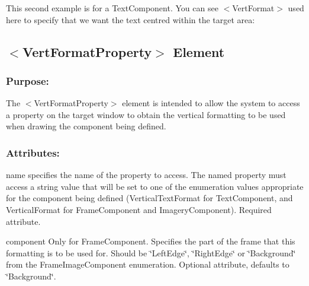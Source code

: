 This second example is for a Text\+Component. You can see {\ttfamily $<$Vert\+Format$>$} used here to specify that we want the text centred within the target area\+: 
\begin{DoxyCode}{0}
\end{DoxyCode}
\hypertarget{fal_element_ref_fal_elem_ref_sec_37}{}\subsection{$<$\+Vert\+Format\+Property$>$ Element}\label{fal_element_ref_fal_elem_ref_sec_37}
\hypertarget{fal_element_ref_fal_elem_ref_sec_37_1}{}\subsubsection{Purpose\+:}\label{fal_element_ref_fal_elem_ref_sec_37_1}
The {\ttfamily $<$Vert\+Format\+Property$>$} element is intended to allow the system to access a property on the target window to obtain the vertical formatting to be used when drawing the component being defined.\hypertarget{fal_element_ref_fal_elem_ref_sec_37_2}{}\subsubsection{Attributes\+:}\label{fal_element_ref_fal_elem_ref_sec_37_2}
\begin{DoxyItemize}
\item {\ttfamily name} specifies the name of the property to access. The named property must access a string value that will be set to one of the enumeration values appropriate for the component being defined (Vertical\+Text\+Format for Text\+Component, and Vertical\+Format for Frame\+Component and Imagery\+Component). Required attribute. \item {\ttfamily component} Only for Frame\+Component. Specifies the part of the frame that this formatting is to be used for. Should be \char`\"{}\+Left\+Edge\char`\"{}, \char`\"{}\+Right\+Edge\char`\"{} or \char`\"{}\+Background\char`\"{} from the Frame\+Image\+Component enumeration. Optional attribute, defaults to \char`\"{}\+Background\char`\"{}.\end{DoxyItemize}
